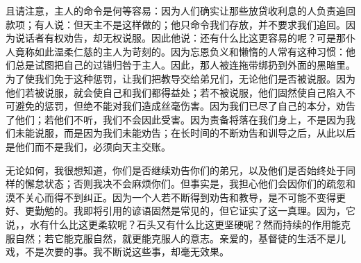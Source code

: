 且请注意，主人的命令是何等容易：因为人们确实让那些放贷收利息的人负责追回款项；有人说：但天主不是这样做的；他只命令我们存放，并不要求我们追回。因为说话者有权劝告，却无权说服。因此他说：还有什么比这更容易的呢？可是那仆人竟称如此温柔仁慈的主人为苛刻的。因为忘恩负义和懒惰的人常有这种习惯：他们总是试图把自己的过错归咎于主人。因此，那人被连拖带绑扔到外面的黑暗里。为了使我们免于这种惩罚，让我们把教导交给弟兄们，无论他们是否被说服。因为他们若被说服，就会使自己和我们都得益处；若不被说服，他们固然使自己陷入不可避免的惩罚，但绝不能对我们造成丝毫伤害。因为我们已尽了自己的本分，劝告了他们；若他们不听，我们不会因此受害。因为责备将落在我们身上，不是因为我们未能说服，而是因为我们未能劝告；在长时间的不断劝告和训导之后，从此以后是他们而不是我们，必须向天主交账。\par

无论如何，我很想知道，你们是否继续劝告你们的弟兄，以及他们是否始终处于同样的懈怠状态；否则我决不会麻烦你们。但事实是，我担心他们会因你们的疏忽和漠不关心而得不到纠正。因为一个人若不断得到劝告和教导，是不可能不变得更好、更勤勉的。我即将引用的谚语固然是常见的，但它证实了这一真理。因为，它说，，水有什么比这更柔软呢？石头又有什么比这更坚硬呢？然而持续的作用能克服自然；若它能克服自然，就更能克服人的意志。亲爱的，基督徒的生活不是儿戏，不是次要的事。我不断说这些事，却毫无效果。\par

